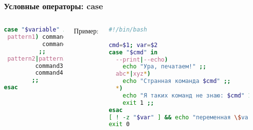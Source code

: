 \begin{frame}[fragile]
\frametitle{Условные операторы: case}

	\small
	\begin{columns}

		\begin{lstlisting}[language=sh,frame=single]
case "$variable" in 
 pattern1) command1
           command2
          ;;
 pattern2|pattern3)
         command3
         command4
        ;;
esac
\end{lstlisting}
		\pause

		{\normalsize Пример:}

		\begin{lstlisting}[language=bash]
#!/bin/bash

cmd=$1; var=$2
case "$cmd" in 
  --print|--echo)
    echo "Ура, печатаем!" ;;
  abc*|xyz*)
    echo "Странная команда $cmd" ;;
  *)
    echo "Я таких команд не знаю: $cmd" 1>&2
    exit 1 ;;
esac
[ ! -z "$var" ] && echo "переменная \$var=$var"
exit 0
\end{lstlisting}


	\end{columns}
\end{frame}
